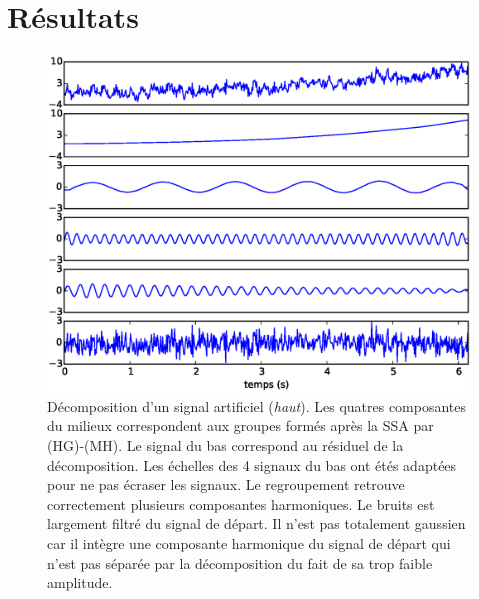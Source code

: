 \documentclass{gretsi}
\newcommand{\set}[1]{\left \{ 1, \dots, #1 \right \}}
\begin{document}
       

\section{Résultats}
\label{sec:res}

    \begin{figure}[tp]
        \hspace{-.5cm}
        \includegraphics[width=.5\textwidth]{img/artsig3.eps}
        \vspace{-.4cm}
        \caption{Décomposition d'un signal artificiel (\emph{haut}). Les quatres composantes du milieux correspondent aux groupes formés après la SSA par (HG)-(MH). Le signal du bas correspond au résiduel de la décomposition. Les échelles des 4 signaux du bas ont étés adaptées pour ne pas écraser les signaux. Le regroupement retrouve correctement plusieurs composantes harmoniques. Le bruits est largement filtré du signal de départ. Il n'est pas totalement gaussien car il intègre une composante harmonique du signal de départ qui n'est pas séparée par la décomposition du fait de sa trop faible amplitude.}
        \label{fig:dec}
    \end{figure}
\end{document}
